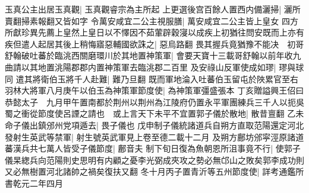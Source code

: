 玉真公主出居玉真觀|{
	玉真觀睿宗為主所起}
上更選後宫百餘人置西内備灑掃|{
	灑所賣翻掃素報翻又皆如字}
令萬安咸宜二公主視服膳|{
	萬安咸宜二公主皆上皇女}
四方所獻珍異先薦上皇然上皇日以不懌因不茹葷辟穀寖以成疾上初猶往問安既而上亦有疾但遣人起居其後上稍悔寤惡輔國欲誅之|{
	惡烏路翻}
畏其握兵竟猶豫不能决　初哥舒翰破吐蕃於臨洮西關磨環川於其地置神策軍|{
	會要天寶十三載哥舒翰以前年收九曲請以其地置洮陽郡郡内置神策軍去臨洮郡二百里}
及安祿山反軍使成如璆|{
	璆與球同}
遣其將衛伯玉將千人赴難|{
	難乃旦翻}
既而軍地淪入吐蕃伯玉留屯於陜累官至右羽林大將軍八月庚午以伯玉為神策軍節度使|{
	為神策軍彊盛張本}
丁亥贈謚興王佋曰恭懿太子　九月甲午置南都於荆州以荆州為江陵府仍置永平軍團練兵三千人以扼吳蜀之衝從節度使呂諲之請也　或上言天下未平不宜置郭子儀於散地|{
	散昔亶翻}
乙未命子儀出鎮邠州党項遁去|{
	畏子儀也}
戊申制子儀統諸道兵自朔方直取范陽還定河北發射生英武等禁軍|{
	射生號英武軍見上卷至德二載十二月}
及朔方鄜坊邠寜涇原諸道蕃漢兵共七萬人皆受子儀節度|{
	鄜音夫}
制下旬日復為魚朝恩所沮事竟不行|{
	使郭子儀杲緫兵向范陽則史思明有内顧之憂李光弼成夾攻之勢必無邙山之敗矣郭李成功則又必無樹置河北諸帥之禍矣復扶又翻}
冬十月丙子置青沂等五州節度使|{
	詳考通鑑所書乾元二年四月}


